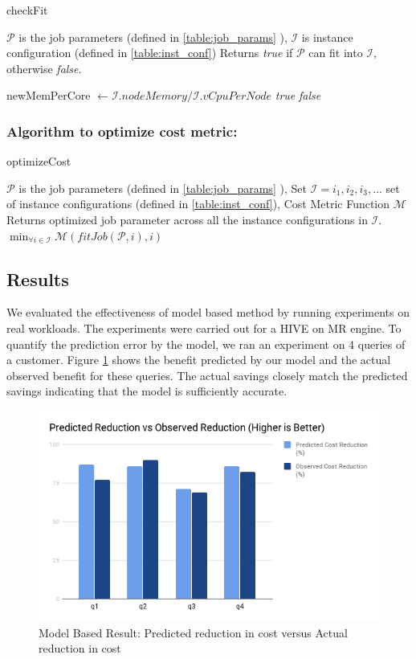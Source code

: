\begin{algorithm}
\caption{checkFit} \label{checkfit}
\begin{algorithmic}[1]
\footnotesize
\REQUIRE $\mathcal{P}$ is the job parameters (defined in \ref{table:job_params} ), $\mathcal{I}$  is instance configuration (defined in \ref{table:inst_conf})
\ENSURE Returns \textit{true} if $\mathcal{P}$ can fit into $\mathcal{I}$, otherwise \textit{false}.

\STATE newMemPerCore $\gets \mathcal{I}.nodeMemory / \mathcal{I}.vCpuPerNode$
\RETURN \textit{true}
\ELSE
\RETURN \textit{false}
\ENDIF
\end{algorithmic}
\end{algorithm}

\noindent\subsubsection*{\bf Algorithm to optimize cost metric:}

\begin{algorithm}
\caption{optimizeCost} \label{cost_optimize}
\begin{algorithmic}[1]
\footnotesize
\REQUIRE $\mathcal{P}$ is the job parameters (defined in \ref{table:job_params} ), Set $\mathcal{I} = {i_1, i_2, i_3, ...} $ set of instance configurations (defined in \ref{table:inst_conf}), Cost Metric Function $\mathcal{M}$
\ENSURE Returns optimized job parameter across all the instance configurations in $\mathcal{I}$.
\RETURN $\min_{\forall i \in \mathcal{I}} \mathcal{M}(fitJob(\mathcal{P}, i), i)$
\end{algorithmic}
\end{algorithm}

\subsection{Results}
We evaluated the effectiveness of model based method by running experiments on real workloads. The experiments were carried out for a HIVE on MR engine. To quantify the prediction error by the model, we ran an experiment on 4 queries of a customer. Figure \ref{fig:modelbasedresult} shows the benefit predicted by our model and the actual observed benefit for these queries. The actual savings closely match the predicted savings indicating that the model is sufficiently accurate.

\begin{figure}[h]
	\includegraphics[width=\linewidth]{chart.png}
	\caption{Model Based Result: Predicted reduction in cost versus Actual reduction in cost}
	\label{fig:modelbasedresult}
\end{figure}